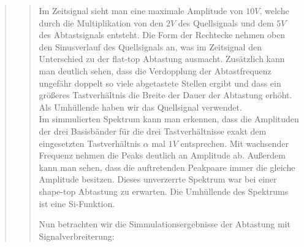 \begin{quote}
\begin{quote}
  	    Im Zeitsignal sieht man eine maximale Amplitude von $10V$, welche durch
  	    die Multiplikation von den $2V$ des Quellsignals und dem $5V$ des
  	    Abtastsignals entsteht. Die Form der Rechtecke nehmen oben den
  	    Sinusverlauf des Quellsignals an, was im Zeitsignal den Unterschied zu
  	    der flat-top Abtastung ausmacht. Zusätzlich kann man deutlich sehen, dass
  	    die Verdopplung der Abtastfrequenz ungefähr doppelt so viele abgetastete Stellen ergibt und 
  	    dass ein größeres Tastverhältnis die Breite der Dauer der Abtastung erhöht. 
  	    Als Umhüllende haben wir das Quellsignal verwendet.\\
  	    Im simmulierten Spektrum kann man erkennen, dass die Amplituden der
  	    drei Basisbänder für die drei Tastverhältnisse exakt dem eingesetzten
  	    Tastverhältnis $\alpha$ mal $1V$ entsprechen. Mit wachsender Frequenz
  	    nehmen die Peaks deutlich an Amplitude ab. Außerdem kann man sehen, dass
  	    die auftretenden Peakpaare immer die gleiche Amplitude besitzen. Dieses
  	    unverzerrte Spektrum war bei einer shape-top Abtastung zu erwarten.
  	    Die Umhüllende des Spektrums ist eine Si-Funktion.
  	    \vspace{1em}
  	    
  	    Nun betrachten wir die Simmulationsergebnisse der Abtastung mit
  	    Signalverbreiterung:
  	    

\end{quote}
\end{quote}
